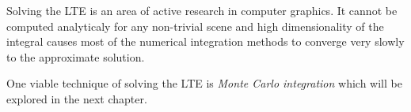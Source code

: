 Solving the LTE is an area of active research in computer graphics. It cannot be computed analyticaly for any non-trivial scene and high dimensionality of the integral causes most of the numerical integration methods to converge very slowly to the approximate solution.

One viable technique of solving the LTE is \emph{Monte Carlo integration} which will be explored in the next chapter.